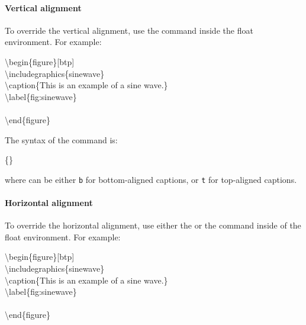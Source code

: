 \paragraph{Vertical alignment} To override the vertical alignment, use the
 command inside the float environment.  For
example:

\begin{fullwidth}
	\begin{docspec}
		\textbackslash begin\{figure\}[btp]\\
		\qquad \textbackslash includegraphics\{sinewave\}\\
		\qquad \textbackslash caption\{This is an example of a sine wave.\}\\
		\qquad \textbackslash label\{fig:sinewave\}\\
		\qquad {}\\
		\textbackslash end\{figure\}
	\end{docspec}
\end{fullwidth}

\noindent The syntax of the  command is:

\begin{docspec}
	\{\}
\end{docspec}

\noindent where  can be either \texttt{b} for bottom-aligned
captions, or \texttt{t} for top-aligned captions.

\paragraph{Horizontal alignment}\label{par:overriding-horizontal}
To override the horizontal alignment, use either the 
or the  command inside of the float environment.  For
example:

\begin{fullwidth}
	\begin{docspec}
		\textbackslash begin\{figure\}[btp]\\
		\qquad \textbackslash includegraphics\{sinewave\}\\
		\qquad \textbackslash caption\{This is an example of a sine wave.\}\\
		\qquad \textbackslash label\{fig:sinewave\}\\
		\qquad {}\\
		\textbackslash end\{figure\}
	\end{docspec}
\end{fullwidth}

